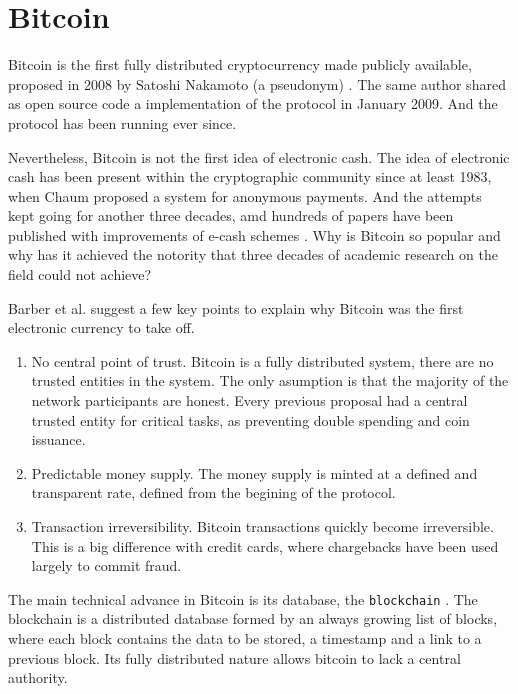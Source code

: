 \section{Bitcoin}
Bitcoin is the first fully distributed cryptocurrency made publicly available,
  proposed in 2008 by Satoshi Nakamoto (a pseudonym) \cite{nakamoto2008bitcoin}.
The same author shared as open source code a implementation of the protocol in
  January 2009. And the protocol has been running ever since.

Nevertheless, Bitcoin is not the first idea of electronic cash.
The idea of electronic cash has been present within the cryptographic community
  since at least 1983, when Chaum \cite{chaum1983blind} proposed a system for
  anonymous payments.
And the attempts kept going for another three decades, amd  hundreds of papers
  have been published with improvements of e-cash schemes
  \cite{barber2012bitter}.
Why is Bitcoin so popular and why has it achieved the notority that three
  decades of academic research on the field could not achieve?

Barber et al.\cite{barber2012bitter} suggest a few key points to explain why
  Bitcoin was the first electronic currency to take off.
\begin{enumerate}
\item No central point of trust.
	Bitcoin is a fully distributed system, there are no trusted entities in the
	  system. The only asumption is that the majority of the network participants
	  are honest. Every previous proposal had a central trusted entity for
	  critical tasks, as preventing double spending and coin issuance.
\item Predictable money supply.
	The money supply is minted at a defined and transparent rate, defined from
	  the begining of the protocol.
\item Transaction irreversibility.
	Bitcoin transactions quickly become irreversible. This is a big difference
	  with credit cards, where chargebacks have been used largely to commit
	  fraud.
\end{enumerate}

  The main technical advance in Bitcoin is its database, the
  \texttt{blockchain} \cite{inventionblockchain}\cite{blockchainmostimportant}.
The blockchain is a distributed database formed by an always growing list of
  blocks, where each block contains the data to be stored, a timestamp and a
  link to a previous block. Its fully distributed nature allows bitcoin to lack
  a central authority.

